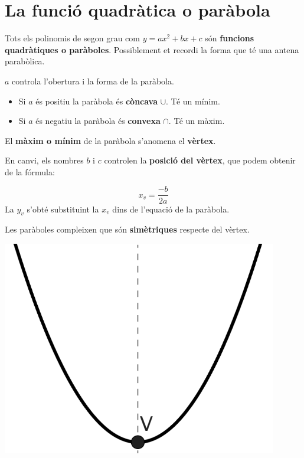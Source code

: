 \section{La funció quadràtica o paràbola}

\begin{theorybox}


Tots els polinomis de segon grau com $y=ax^2+bx+c$ són \textbf{funcions quadràtiques o paràboles}. 
Possiblement et recordi la forma que té una antena parabòlica.


$a$ controla l'obertura i la forma de la paràbola. 
\begin{itemize}
	\item Si $a$ és positiu la paràbola és \textbf{còncava} $\cup$. Té un mínim.
	\item Si $a$ és negatiu la paràbola és \textbf{convexa} $\cap$. Té un màxim.
\end{itemize}

El \textbf{màxim o mínim} de la paràbola s'anomena el \textbf{vèrtex}.

En canvi, els nombres $b$ i $c$ controlen la \textbf{posició del vèrtex}, que podem obtenir de la fórmula:

\begin{minipage}{0.7\textwidth}
\begin{equation*}
x_v = \frac{-b}{2a}
\end{equation*}
La $y_v$ s'obté substituint la $x_v$ dins de l'equació de la paràbola.

Les paràboles compleixen que són \textbf{simètriques} respecte del vèrtex.
\end{minipage}
\begin{minipage}{0.25\textwidth}
	\centering
	\includegraphics[width=0.9\textwidth]{img-08/parabola}
\end{minipage}
\end{theorybox}	


